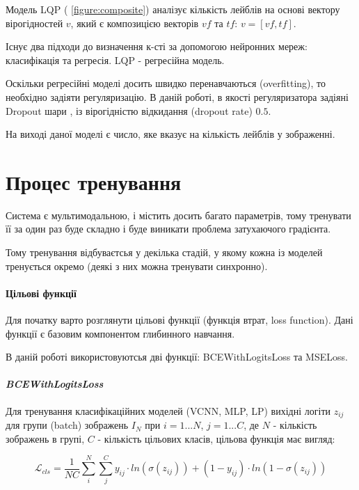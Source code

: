 \documentclass{udstu}
\begin{document}
Модель LQP (\figurename{ \ref{figure:composite}}) аналізує кількість лейблів на основі вектору вірогідностей $v$,
який є композицією векторів $vf$ та $tf$: $v = [vf, tf]$.

Існує два підходи до визначення к-сті за допомогою нейронних мереж: класифікація та регресія.
LQP - регресійна модель.

Оскільки регресійні моделі досить швидко перенавчаються (overfitting), то необхідно задіяти регуляризацію.
В даній роботі, в якості регуляризатора задіяні Dropout шари \cite{dropout}, із вірогідністю відкидання (dropout rate) $0.5$.

На виході даної моделі є число, яке вказує на кількість лейблів у зображенні.


\section{Процес тренування}

Система є мультимодальною, і містить досить багато параметрів, тому тренувати її за один раз буде складно
і буде виникати проблема затухаючого градієнта.

Тому тренування відбуваєтсья у декілька стадій, у якому кожна із моделей тренується окремо
(деякі з них можна тренувати синхронно).


\paragraph{\textbf{Цільові функції}\\}

Для початку варто розглянути цільові функції (функція втрат, loss function).
Дані функції є базовим компонентом глибинного навчання.

В даній роботі використовуютсья дві функції: BCEWithLogitsLoss та MSELoss.

\paragraph{\textit{BCEWithLogitsLoss}\\}

Для тренування класифікаційних моделей (VCNN, MLP, LP) вихідні логіти $z_{ij}$
для групи (batch) зображень $I_N$ при $i = 1...N$, $j = 1...C$,
де $N$ - кількість зображень в групі, $C$ - кількість цільових класів,
цільова функція має вигляд:

\begin{equation}
\mathcal{L}_{cls} = \frac{1}{NC} \sum_{i}^{N} \sum_{j}^{C}
y_{ij} \cdot ln(\sigma(z_{ij})) + (1 - y_{ij}) \cdot ln(1 - \sigma(z_{ij}))
\end{equation}
\end{document}
